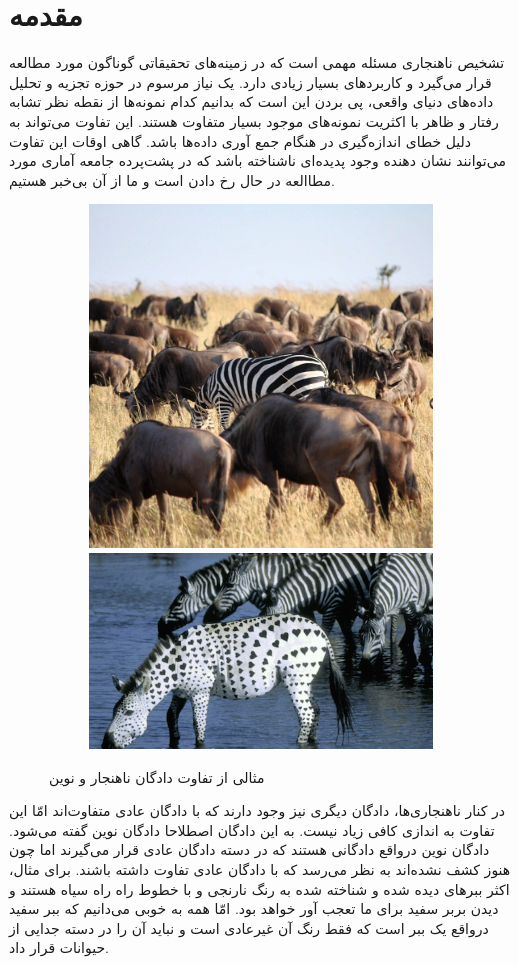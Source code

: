 \documentclass[12pt,a4paper]{report}
\theoremstyle{definition}
\theoremstyle{definition}
\begin{document}
	\chapter{مقدمه}
	تشخیص ناهنجاری‌ مسئله مهمی است که در زمینه‌های تحقیقاتی گوناگون مورد مطالعه قرار می‌گیرد و کاربرد‌های بسیار زیادی دارد. یک نیاز مرسوم در حوزه تجزیه و تحلیل داده‌های دنیای واقعی، پی بردن این است که بدانیم کدام نمونه‌ها از نقطه نظر تشابه رفتار و ظاهر با اکثریت نمونه‌های موجود بسیار متفاوت هستند. این تفاوت می‌تواند به دلیل خطای انداز‌ه‌گیری در هنگام جمع آوری داده‌ها باشد. گاهی اوقات این تفاوت می‌توانند نشان‌ دهنده وجود پدیده‌ای ناشناخته‌ باشد که در پشت‌پرده جامعه آماری مورد مطاالعه در حال رخ دادن است و ما از آن بی‌خبر هستیم. 
	
	\begin{figure}[hp]
		  \begin{subfigure}{\linewidth}
			  \includegraphics[width=.5\linewidth]{./images/figures/zibra-anomaly.png}\hfill
			  \includegraphics[width=.5\linewidth]{./images/figures/zibra-novel.png}
		  \end{subfigure}\par\medskip		  
		  \caption{مثالی از تفاوت دادگان ناهنجار و نوین}
		  \label{fig:novel-vs-anomaly}
	\end{figure}

در کنار ناهنجاری‌ها، دادگان دیگری نیز وجود دارند که با دادگان عادی متفاوت‌اند امّا این تفاوت به اندازی کافی زیاد نیست. به این دادگان اصطلاحا دادگان نوین گفته می‌شود. دادگان نوین درواقع دادگانی هستند که در دسته دادگان عادی قرار می‌گیرند اما چون هنوز کشف نشده‌اند به نظر می‌رسد که با دادگان عادی تفاوت داشته باشند. برای مثال، اکثر ببر‌های دیده شده و شناخته شده به رنگ نارنجی و با خطوط راه راه سیاه هستند و دیدن بربر سفید برای ما تعجب آور خواهد بود. امّا همه به خوبی می‌دانیم که ببر سفید درواقع یک ببر است که فقط رنگ آن غیرعادی است و نباید آن را در دسته جدایی از حیوانات قرار داد.\\
\end{document}
